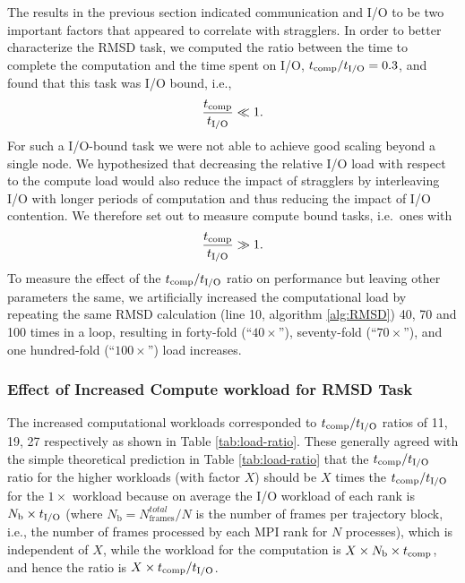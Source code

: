 The results in the previous section indicated communication and I/O to be two important factors that appeared to correlate with stragglers. 
In order to better characterize the RMSD task, we computed the ratio between the time to complete the computation and the time spent on I/O, ${t}_{\text{comp}}/{t}_{\text{I/O}} = 0.3$, and found that this task was I/O bound, i.e.,
\begin{gather*}
  \frac{{t}_{\text{comp}}}{{t}_{\text{I/O}}} \ll 1.
\end{gather*}
For such a I/O-bound task we were not able to achieve good scaling beyond a single node. 
We hypothesized that decreasing the relative I/O load with respect to the compute load would also reduce the impact of stragglers by interleaving I/O with longer periods of computation and thus reducing the impact of I/O contention.
We therefore set out to measure compute bound tasks, i.e.\ ones with
\begin{gather*}
  \frac{{t}_{\text{comp}}}{{t}_{\text{I/O}}} \gg 1.
\end{gather*}
To measure the effect of the ${t}_{\text{comp}}/{t}_{\text{I/O}}$ ratio on performance but leaving other parameters the same, we artificially increased the computational load by repeating the same RMSD calculation (line 10, algorithm \ref{alg:RMSD}) 40, 70 and 100 times in a loop, resulting in forty-fold (``$40\times$''), seventy-fold (``$70\times$''), and one hundred-fold (``$100\times$'') load increases.

\subsubsection{Effect of Increased Compute workload for RMSD Task}

The increased computational workloads corresponded to ${t}_{\text{comp}}/{t}_{\text{I/O}}$ ratios of 11, 19, 27 respectively as shown in Table \ref{tab:load-ratio}.
These generally agreed with the simple theoretical prediction in Table \ref{tab:load-ratio} that the ${t}_{\text{comp}}/{t}_{\text{I/O}}$ ratio for the higher workloads (with factor $X$) should be $X$ times the ${t}_{\text{comp}}/{t}_{\text{I/O}}$ for the $1\times$ workload because on average the I/O workload of each rank is $N_{\text{b}} \times {t}_{\text{I/O}} $ (where $N_{\text{b}} = N_{\text{frames}}^{total}/N$ is the number of frames per trajectory block, i.e., the number of frames processed by each MPI rank for $N$ processes), which is independent of $X$, while the workload for the computation is $X \times N_{\text{b}} \times {t}_{\text{comp}}$, and hence the ratio is $X \times {t}_{\text{comp}}/{t}_{\text{I/O}}$.

